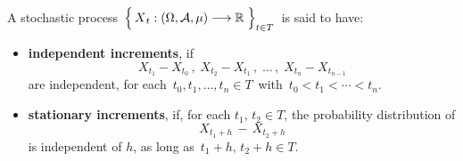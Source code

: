 
\vskip 0.5cm
\begin{definition}
\mbox{}
\vskip 0.1cm
\noindent
A stochastic process
\,$\left\{\,\overset{{\color{white}.}}{X}_{t} : (\Omega,\mathcal{A},\mu) \longrightarrow \Re \;\right\}_{t \in T}$\,
is said to have:
\begin{itemize}
\item
	\textbf{independent increments}, if
	\begin{equation*}
	X_{t_{1}} - X_{t_{0}}\,,\;
	X_{t_{2}} - X_{t_{1}}\,,\;
	\ldots\,,\;
	X_{t_{n}} - X_{t_{n-1}}
	\end{equation*}
	are independent, for each \,$t_{0}, t_{1}, \ldots, t_{n} \in T$\,
	with \,$t_{0} < t_{1} < \cdots < t_{n}$.
\item
	\textbf{stationary increments}, if,
	for each $t_{1},\, t_{2} \in T$, the probability distribution of
	\begin{equation*}
	X_{t_{1}+h} \,-\, X_{t_{2}+h}
	\end{equation*}
	is independent of $h$, as long as \,$t_{1} + h,\, t_{2} + h \in T$.
\end{itemize}
\end{definition}


